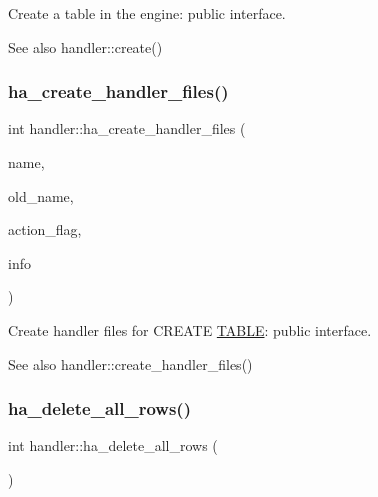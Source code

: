 Create a table in the engine\+: public interface.

\begin{DoxySeeAlso}{See also}
handler\+::create() 
\end{DoxySeeAlso}
\mbox{\label{classhandler_a722462d7e71059a8ed1f43d0fb28366b}} 
\subsubsection{\texorpdfstring{ha\+\_\+create\+\_\+handler\+\_\+files()}{ha\_create\_handler\_files()}}
{\footnotesize\ttfamily int handler\+::ha\+\_\+create\+\_\+handler\+\_\+files (\begin{DoxyParamCaption}\item[{const char $\ast$}]{name,  }\item[{const char $\ast$}]{old\+\_\+name,  }\item[{int}]{action\+\_\+flag,  }\item[{\mbox{\hyperlink{structst__ha__create__information}{H\+A\+\_\+\+C\+R\+E\+A\+T\+E\+\_\+\+I\+N\+FO}} $\ast$}]{info }\end{DoxyParamCaption})}

Create handler files for C\+R\+E\+A\+TE \mbox{\hyperlink{structTABLE}{T\+A\+B\+LE}}\+: public interface.

\begin{DoxySeeAlso}{See also}
handler\+::create\+\_\+handler\+\_\+files() 
\end{DoxySeeAlso}
\mbox{\label{classhandler_a1fef228137a11565f7d52a60ad802004}} 
\subsubsection{\texorpdfstring{ha\+\_\+delete\+\_\+all\+\_\+rows()}{ha\_delete\_all\_rows()}}
{\footnotesize\ttfamily int handler\+::ha\+\_\+delete\+\_\+all\+\_\+rows (\begin{DoxyParamCaption}{ }\end{DoxyParamCaption})}

